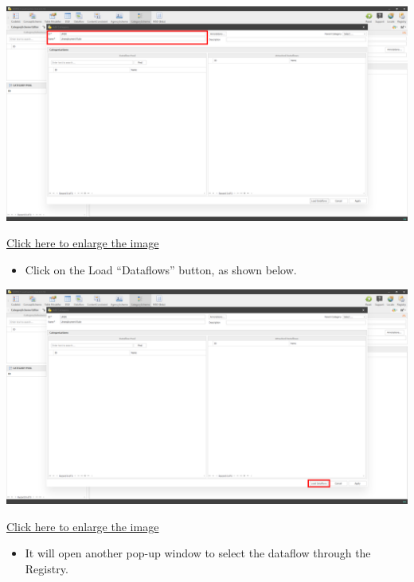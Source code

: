 \documentclass[
]{book}
\providecommand{\tightlist}{%
  \setlength{\itemsep}{0pt}\setlength{\parskip}{0pt}}
\begin{document}
\begin{center}\includegraphics[width=1\linewidth]{./images/image164} \end{center}

\href{images/image164.png}{Click here to enlarge the image}

\begin{itemize}
\tightlist
\item
  Click on the Load ``Dataflows'' button, as shown below.
\end{itemize}

\begin{center}\includegraphics[width=1\linewidth]{./images/image166} \end{center}

\href{images/image166.png}{Click here to enlarge the image}

\begin{itemize}
\tightlist
\item
  It will open another pop-up window to select the dataflow through the Registry.
\end{itemize}
\end{document}
